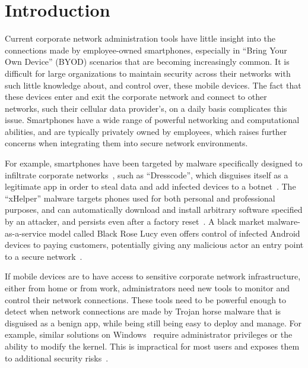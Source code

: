 \section{Introduction}
\label{sec:introduction}


Current corporate network administration tools have little insight into the
connections made by employee-owned smartphones, especially in ``Bring Your Own
Device'' (BYOD) scenarios that are becoming increasingly common. It is difficult
for large organizations to maintain security across their networks with such
little knowledge about, and control over, these mobile devices. The fact that
these devices enter and exit the corporate network and connect to other
networks, such their cellular data provider's, on a daily basis complicates this
issue. Smartphones have a wide range of powerful networking and computational
abilities, and are typically privately owned by employees, which raises further
concerns when integrating them into secure network environments.

For example, smartphones have been targeted by malware specifically designed to
infiltrate corporate networks~\cite{kan2016}, such as ``Dresscode'', which
disguises itself as a legitimate app in order to steal data and add infected
devices to a botnet~\cite{palmer2016}. The ``xHelper'' malware targets phones
used for both personal and professional purposes, and can automatically download
and install arbitrary software specified by an attacker, and persists even after
a factory reset~\cite{vijayan2020}. A black market malware-as-a-service model
called Black Rose Lucy even offers control of infected Android devices to paying
customers, potentially giving any malicious actor an entry point to a secure
network~\cite{wong2018}.

If mobile devices are to have access to sensitive corporate network
infrastructure, either from home or from work, administrators need new tools to
monitor and control their network connections. These tools need to be powerful
enough to detect when network connections are made by Trojan horse malware that
is disguised as a benign app, while being still being easy to deploy and manage.
For example, similar solutions on Windows~\cite{chuluundorj2019, kwon2011}
require administrator privileges or the ability to modify the kernel. This is
impractical for most users and exposes them to additional security
risks~\cite{google2020}.


